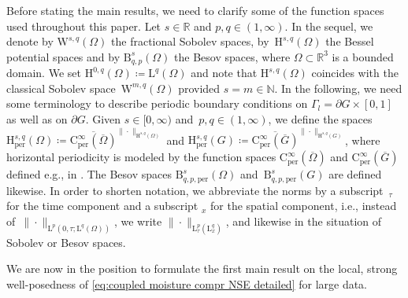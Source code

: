 \documentclass[10pt]{amsart}
\theoremstyle{plain}
\theoremstyle{definition}
\theoremstyle{thm}
\numberwithin{equation}{section}
\newcommand{\rL}{\mathrm{L}}
\newcommand{\rH}{\mathrm{H}}
\newcommand{\rW}{\mathrm{W}}
\newcommand{\rB}{\mathrm{B}}
\newcommand{\rC}{\mathrm{C}}
\newcommand{\N}{\mathbb{N}}
\newcommand{\R}{\mathbb{R}}
\newcommand{\per}{\mathrm{per}}
\begin{document}
Before stating the main results, we need to clarify some of the function spaces used throughout this paper.
Let $s \in \R$ and $p,q \in (1,\infty)$. In the sequel, we
denote by $\rW^{s,q}(\Omega)$ the fractional Sobolev spaces, by~$\rH^{s,q}(\Omega)$ the Bessel potential spaces and  by $\rB^{s}_{q,p}(\Omega)$ the Besov spaces, where $\Omega \subset \R^3$ is a bounded domain.
We set $\rH^{0,q}(\Omega) \coloneqq \rL^q(\Omega)$ and note that $\rH^{s,q}(\Omega)$ coincides with the 
classical Sobolev space~$\rW^{m,q}(\Omega)$ provided  $s=m \in \N$. 
In the following, we need some terminology to describe periodic boundary conditions on $\Gamma_l = \partial G \times [0,1]$ as well as on $\partial G$. 
Given $s \in [0,\infty)$ and~$p,q \in (1,\infty)$, we define the spaces $\rH^{s,q}_\per (\Omega) \coloneqq \overline{\rC^\infty_\per (\overline{\Omega})}^{\| \cdot \|_{\rH^{s,q}(\Omega)}}$ and $\rH^{s,q}_\per (G) \coloneqq \overline{\rC^\infty_\per (\overline{G})}^{\| \cdot \|_{\rH^{s,q}(G)}}$, where horizontal periodicity is modeled by the function spaces $\rC^\infty_\per(\overline{\Omega})$ and $\rC^\infty_\per(\overline{G})$ defined e.g., in \cite{HK:16}. 
The Besov spaces $\rB^s_{q,p,\per}(\Omega)$ and~$\rB^s_{q,p,\per}(G)$ are defined likewise. 
In order to shorten notation, we abbreviate the norms by a subscript~$_\tau$ for the time component and a subscript $_x$ for the spatial component, i.e., instead of~$\| \cdot \|_{\rL^p(0,\tau;\rL^q(\Omega))}$, we write $\| \cdot \|_{\rL_{\tau}^p(\rL_x^q)}$, and likewise in the situation of Sobolev or Besov spaces.

We are now in the position to formulate the first main result on the local, strong well-posedness of \eqref{eq:coupled moisture compr NSE detailed} for large data.
\end{document}

